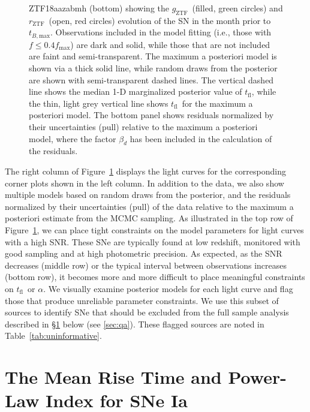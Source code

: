 \documentclass[twocolumn]{./aastex63}
\newcommand{\rztf}{$r_\mathrm{ZTF}$}
\newcommand{\gztf}{$g_\mathrm{ZTF}$}
\newcommand{\tfl}{$t_\mathrm{fl}$}
\newcommand{\tbmax}{$t_{B,\mathrm{max}}$}
\begin{document}
\begin{figure}
{    ZTF18aazabmh (bottom) showing the \gztf\ (filled, green circles) and
    \rztf\ (open, red circles) evolution of the SN in the month prior to
    \tbmax. Observations included in the model fitting (i.e., those with $f
    \le 0.4 f_\mathrm{max}$) are dark and solid, while those that are not
    included are faint and semi-transparent. The maximum a posteriori model is
    shown via a thick solid line, while random draws from the posterior are
    shown with semi-transparent dashed lines. The vertical dashed line shows
    the median 1-D marginalized posterior value of \tfl, while the thin, light
    grey vertical line shows \tfl\ for the maximum a posteriori model. The
    bottom panel shows residuals normalized by their uncertainties (pull)
    relative to the maximum a posteriori model, where the factor $\beta_d$ has
    been included in the calculation of the residuals.}
    \label{fig:corner_LC}
\end{figure}

The right column of Figure~\ref{fig:corner_LC} displays the light curves for
the corresponding corner plots shown in the left column. In addition to the
data, we also show multiple models based on random draws from the posterior,
and the residuals normalized by their uncertainties (pull) of the data
relative to the maximum a posteriori estimate from the MCMC sampling. As
illustrated in the top row of Figure~\ref{fig:corner_LC}, we can place tight
constraints on the model parameters for light curves with a high SNR. These
SNe are typically found at low redshift, monitored with good sampling and at
high photometric precision. As expected, as the SNR decreases (middle row) or
the typical interval between observations increases (bottom row), it becomes
more and more difficult to place meaningful constraints on \tfl\ or $\alpha$.
We visually examine posterior models for each light curve and flag those that
produce unreliable parameter constraints. We use this subset of sources to
identify SNe that should be excluded from the full sample analysis described
in \S\ref{sec:mean_parameters} below (see \ref{sec:qa}). These flagged sources
are noted in Table~\ref{tab:uninformative}.

\section{The Mean Rise Time and Power-Law Index for SNe
Ia}\label{sec:mean_parameters}
\end{document}
